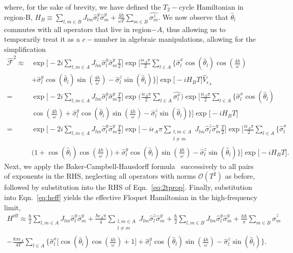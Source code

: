 \documentclass[12pt]{iopart}
\begin{document}
where, for the sake of brevity, we have defined the $T_2-$cycle Hamiltonian in region-B, $\displaystyle {H}_B \equiv \sum_{l,m\in B} J_{lm} \hat{\sigma}^y_l\hat{\sigma}^y_m + \frac{4h}{\omega T}\sum_{m \in B}\hat{\sigma^z_m}$. We now observe that $\hat{\theta}_l$ commutes with all operators that live in region$-A$, thus allowing us to temporarily treat it as a $c-$number in algebraic manipulations, allowing for the simplification
\begin{align}		
    \hat{\mathcal{F}}^2 	\approx& \exp\Bigg[-2i  \sum_{l,m\in A}J_{lm} \hat{\sigma}^y_l\hat{\sigma}^y_m\frac{T}{2}\Bigg]\exp\Bigg[\frac{i \epsilon_A \pi}{2}\sum_{l\in A}\Bigg\{\hat{\sigma}^x_l \cos(\hat{\theta}_l)\cos(\frac{4h}{\omega})\nonumber\\
    &+ \hat{\sigma}^y_l \cos(\hat{\theta}_l)\sin(\frac{4h}{\omega})-\hat{\sigma}^z_l \sin(\hat{\theta}_l)\Bigg\}\Bigg] \exp\big[-i H_B T\big]\hat{V}_{\epsilon_A}\nonumber\\
    =&\exp\Bigg[-2i \sum_{l,m\in A}J_{lm} \hat{\sigma}_l^y\hat{\sigma}_m^y\frac{T}{2}\Bigg] \exp\Big(\frac{i\epsilon_A \pi}{2}\sum_{l\in A}\hat{\sigma^x_l}\Big) \exp\Bigg[\frac{i \epsilon_A \pi}{2}\sum_{l\in A}\Bigg\{\hat{\sigma}^x_l \cos(\hat{\theta}_l)\nonumber\\
    & \cos(\frac{4h}{\omega})+\hat{\sigma}^y_l \cos(\hat{\theta}_l)\sin(\frac{4h}{\omega})-\hat{\sigma}^z_l \sin(\hat{\theta}_l)\Bigg\}\Bigg]\exp\big[-i H_B T\big]\nonumber\\
    =&\exp\Bigg[-2i\sum_{l,m\in A}J_{lm}\hat{\sigma}^y_l\hat{\sigma}^y_m \frac{T}{2}\Bigg] \exp\Bigg[-i\epsilon_A \pi \sum_{\substack{l,m \in A\\l\neq m}}J_{lm} \hat{\sigma}^z_l\hat{\sigma}^y_m\frac{T}{2}\Bigg] 
     \exp\Bigg[\frac{i \epsilon_A \pi}{2}\sum_{l\in A}\Bigg\{\hat{\sigma}^x_l\nonumber\\
     &\Bigg(1+ \cos(\hat{\theta}_l)\cos(\frac{4h}{\omega})\Bigg)
    +\hat{\sigma}^y_l \cos(\hat{\theta}_l)\sin(\frac{4h}{\omega})-\hat{\sigma}^z_l \sin(\hat{\theta}_l)\Bigg\}\Bigg] \exp\big[-i H_B T\big].
\end{align}
Next, we apply the Baker-Campbell-Hausdorff formula~\cite{Magnus1954} successively to all pairs of exponents in the RHS, neglecting all operators with norms $\mathcal{O}(T^2)$ as before, followed by substitution into the RHS of Eqn.~\ref{eq:2tprop}. Finally, substitution into Eqn.~\ref{eq:heff} yields the effective Floquet Hamiltonian in the high-frequency limit, 
\begin{multline}
    H^{\mathrm{eff}} \approx\frac{\hbar}{2} \sum_{l,m\in A}J_{lm}\hat{\sigma}_l^y\hat{\sigma}_m^y +\frac{\hbar \epsilon_A \pi}{4} \sum_{\substack{l,m\in A\\l\neq m}} J_{lm}\hat{\sigma}^z_l\hat{\sigma}^y_m + \frac{\hbar}{2}\sum_{l,m\in B}J_{lm}\hat{\sigma}_l^y \hat{\sigma}_m^y + \frac{h\hbar}{\pi}\sum_{m \in B}\hat{\sigma}^z_m \\ -\frac{\hbar \pi \epsilon_A}{4T}\sum_{l\in A}\Bigg\{\hat{\sigma}^x_l \bigg[\cos(\hat{\theta}_l)\cos(\frac{4h}{\omega})+1 \bigg] + \hat{\sigma}^y_l \cos(\hat{\theta}_l)\sin(\frac{4h}{\omega})-\hat{\sigma}^z_l \sin(\hat{\theta}_l)\Bigg\}.
    \label{eq:app:nfloq_eff3}
\end{multline}
\end{document}
